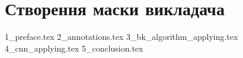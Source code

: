 \chapter{Створення маски викладача}
{1_preface.tex}
{2_annotations.tex}
{3_bk_algorithm_applying.tex}
{4_cnn_applying.tex}
{5_conclusion.tex}

